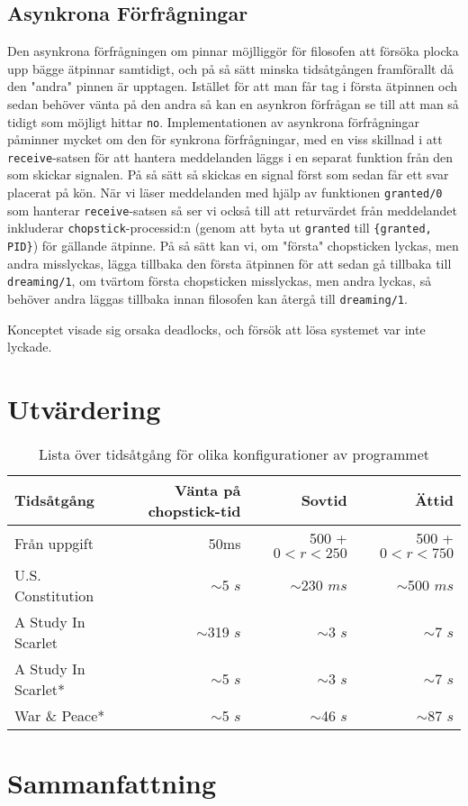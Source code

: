 \documentclass[a4paper, 11pt]{article}
\begin{document}
\subsection{Asynkrona Förfrågningar}
Den asynkrona förfrågningen om pinnar möjlliggör för filosofen att försöka plocka upp bägge ätpinnar samtidigt, och på så sätt minska tidsåtgången framförallt då den "andra" pinnen är upptagen. Istället för att man får tag i första ätpinnen och sedan behöver vänta på den andra så kan en asynkron förfrågan se till att man så tidigt som möjligt hittar \texttt{no}. Implementationen av asynkrona förfrågningar påminner mycket om den för synkrona förfrågningar, med en viss skillnad i att \texttt{receive}-satsen för att hantera meddelanden läggs i en separat funktion från den som skickar signalen. På så sätt så skickas en signal först som sedan får ett svar placerat på kön. När vi läser meddelanden med hjälp av funktionen \texttt{granted/0} som hanterar \texttt{receive}-satsen så ser vi också till att returvärdet från meddelandet inkluderar \texttt{chopstick}-processid:n (genom att byta ut \texttt{granted} till \texttt{\{granted, PID\}}) för gällande ätpinne. På så sätt kan vi, om "första" chopsticken lyckas, men andra misslyckas, lägga tillbaka den första ätpinnen för att sedan gå tillbaka till \texttt{dreaming/1}, om tvärtom första chopsticken misslyckas, men andra lyckas, så behöver andra läggas tillbaka innan filosofen kan återgå till \texttt{dreaming/1}.

Konceptet visade sig orsaka deadlocks, och försök att lösa systemet var inte lyckade.

\section{Utvärdering}
\begin{table}[h]
\centering
\begin{tabular}{|l|r|r|r|}  
\hline
Tidsåtgång & Vänta på chopstick-tid & Sovtid & Ättid\\
\hline
Från uppgift & 50ms & 500 + $0 < r < 250$ & 500 + $0 < r < 750$\\
\hline
U.S. Constitution & $\sim$5 $s$ & $\sim$230 $ms$ & $\sim$500 $ms$\\
\hline
A Study In Scarlet & $\sim$319 $s$ & $\sim$3 $s$ & $\sim$7 $s$\\
\hline
A Study In Scarlet* & $\sim$5 $s$ & $\sim$3 $s$ & $\sim$7 $s$ \\
\hline
War \& Peace* & $\sim$5 $s$ & $\sim$46 $s$ & $\sim$87 $s$\\
\hline
\end{tabular}
\caption{Lista över tidsåtgång för olika konfigurationer av programmet}
\label{tab:timer}
\end{table}

\section{Sammanfattning}
\end{document}
